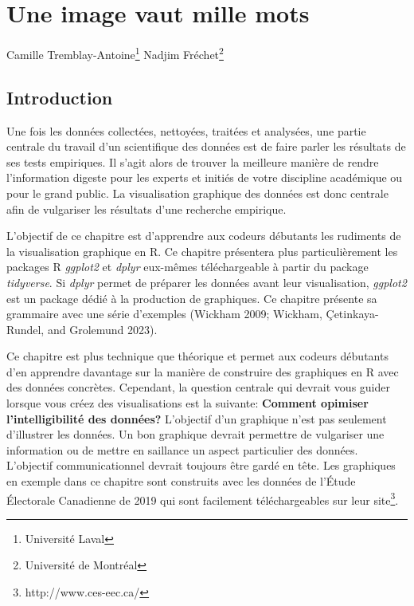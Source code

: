 \documentclass[
  letterpaper,
]{scrbook}
\begin{document}

\hypertarget{une-image-vaut-mille-mots}{%
\chapter{Une image vaut mille mots}\label{une-image-vaut-mille-mots}}

Camille Tremblay-Antoine\footnote{Université Laval} Nadjim
Fréchet\footnote{Université de Montréal}

\hypertarget{introduction-1}{%
\section{Introduction}\label{introduction-1}}

Une fois les données collectées, nettoyées, traitées et analysées, une
partie centrale du travail d'un scientifique des données est de faire
parler les résultats de ses tests empiriques. Il s'agit alors de trouver
la meilleure manière de rendre l'information digeste pour les experts et
initiés de votre discipline académique ou pour le grand public. La
visualisation graphique des données est donc centrale afin de vulgariser
les résultats d'une recherche empirique.

L'objectif de ce chapitre est d'apprendre aux codeurs débutants les
rudiments de la visualisation graphique en R. Ce chapitre présentera
plus particulièrement les packages R \emph{ggplot2} et \emph{dplyr}
eux-mêmes téléchargeable à partir du package \emph{tidyverse}. Si
\emph{dplyr} permet de préparer les données avant leur visualisation,
\emph{ggplot2} est un package dédié à la production de graphiques. Ce
chapitre présente sa grammaire avec une série d'exemples (Wickham 2009;
Wickham, Çetinkaya-Rundel, and Grolemund 2023).

Ce chapitre est plus technique que théorique et permet aux codeurs
débutants d'en apprendre davantage sur la manière de construire des
graphiques en R avec des données concrètes. Cependant, la question
centrale qui devrait vous guider lorsque vous créez des visualisations
est la suivante: \textbf{Comment opimiser l'intelligibilité des
données?} L'objectif d'un graphique n'est pas seulement d'illustrer les
données. Un bon graphique devrait permettre de vulgariser une
information ou de mettre en saillance un aspect particulier des données.
L'objectif communicationnel devrait toujours être gardé en tête. Les
graphiques en exemple dans ce chapitre sont construits avec les données
de l'Étude Électorale Canadienne de 2019 qui sont facilement
téléchargeables sur leur site\footnote{http://www.ces-eec.ca/}.
\end{document}
